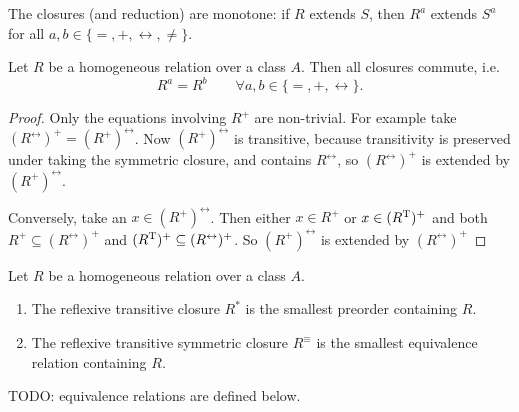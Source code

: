 \begin{lemma}
The closures (and reduction) are monotone: if $R$ extends $S$, then $R^a$ extends $S^a$ for all $a,b\in\{=,+,\leftrightarrow,\neq\}$.
\end{lemma}

\begin{lemma}
Let $R$ be a homogeneous relation over a class $A$. Then all closures commute, i.e.\
\[ R^a = R^b \qquad \forall a,b\in\{=,+,\leftrightarrow\}. \]
\end{lemma}
\begin{proof}
Only the equations involving $R^+$ are non-trivial. For example take $(R^\leftrightarrow)^+ = (R^+)^\leftrightarrow$. Now $(R^+)^\leftrightarrow$ is transitive, because transitivity is preserved under taking the symmetric closure, and contains $R^\leftrightarrow$, so $(R^\leftrightarrow)^+$ is extended by $(R^+)^\leftrightarrow$.

Conversely, take an $x\in (R^+)^\leftrightarrow$. Then either $x\in R^+$ or $x\in (R^{\mathrm{T}})^+$ and both $R^+\subseteq (R^\leftrightarrow)^+$ and $(R^{\mathrm{T}})^+\subseteq (R^\leftrightarrow)^+$. So $(R^+)^\leftrightarrow$ is extended by $(R^\leftrightarrow)^+$
\end{proof}

\begin{lemma}
Let $R$ be a homogeneous relation over a class $A$.
\begin{enumerate}
\item The reflexive transitive closure $R^*$ is the smallest preorder containing $R$.
\item The reflexive transitive symmetric closure $R^\equiv$ is the smallest equivalence relation containing $R$.
\end{enumerate}
\end{lemma}
TODO: equivalence relations are defined below.

